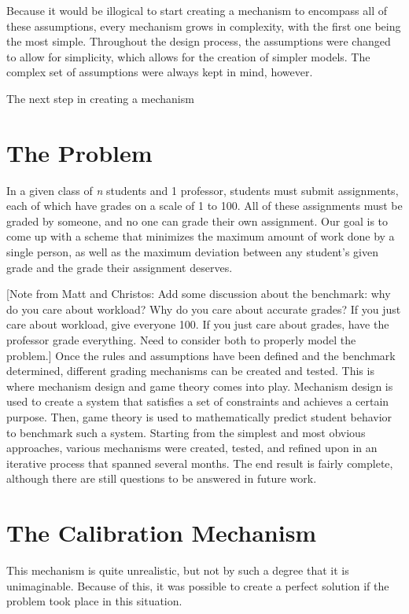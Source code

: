 \documentclass[12pt, Arial]{article}
\begin{document}
Because it would be illogical to start creating a mechanism to encompass all of these assumptions, every mechanism grows in complexity, with the first one being the most simple. Throughout the design process, the assumptions were changed to allow for simplicity, which allows for the creation of simpler models. The complex set of assumptions were always kept in mind, however.

The next step in creating a mechanism
\section{The Problem}
In a given class of \emph{n} students and 1 professor, students must submit assignments, each of which have grades on a scale of 1 to 100. All of these assignments must be graded by someone, and no one can grade their own assignment. Our goal is to come up with a scheme that minimizes the maximum amount of work done by a single person, as well as the maximum deviation between any student's given grade and the grade their assignment deserves.


[Note from Matt and Christos: Add some discussion about the benchmark: why do you care about workload? Why do you care about accurate grades? If you just care about workload, give everyone 100. If you just care about grades, have the professor grade everything. Need to consider both to properly model the problem.]
Once the rules and assumptions have been defined and the benchmark determined, different grading mechanisms can be created and tested. This is where mechanism design and game theory comes into play. Mechanism design is used to create a system that satisfies a set of constraints and achieves a certain purpose. Then, game theory is used to mathematically predict student behavior to benchmark such a system. Starting from the simplest and most obvious approaches, various mechanisms were created, tested, and refined upon in an iterative process that spanned several months. The end result is fairly complete, although there are still questions to be answered in future work.

\section{The Calibration Mechanism}

This mechanism is quite unrealistic, but not by such a degree that it is unimaginable. Because of this, it was possible to create a perfect solution if the problem took place in this situation.
\end{document}
